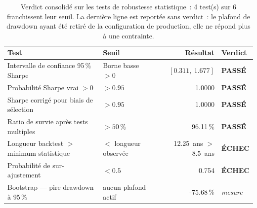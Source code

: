 \begin{table}[H]
\centering
\caption{Verdict consolidé sur les tests de robustesse statistique~: 4 test(s) sur 6 franchissent leur seuil. La dernière ligne est reportée sans verdict~: le plafond de drawdown ayant été retiré de la configuration de production, elle ne répond plus à une contrainte.}
\label{tab:robustness_verdict_summary}
\begin{tabular}{llrl}
\toprule
Test & Seuil & Résultat & Verdict \\
\midrule
Intervalle de confiance 95\,\% Sharpe & Borne basse $> 0$ & $[0.311,\ 1.677]$ & \textcolor{rsiGreen}{\textbf{PASSÉ}} \\
Probabilité Sharpe vrai $> 0$ & $> 0.95$ & 1.0000 & \textcolor{rsiGreen}{\textbf{PASSÉ}} \\
Sharpe corrigé pour biais de sélection & $> 0.95$ & 1.0000 & \textcolor{rsiGreen}{\textbf{PASSÉ}} \\
Ratio de survie après tests multiples & $> 50\,\%$ & 96.11\,\% & \textcolor{rsiGreen}{\textbf{PASSÉ}} \\
Longueur backtest $>$ minimum statistique & $<$ longueur observée & 12.25~ans $>$ 8.5~ans & \textcolor{tsOrange}{\textbf{ÉCHEC}} \\
Probabilité de sur-ajustement & $< 0.5$ & 0.754 & \textcolor{tsOrange}{\textbf{ÉCHEC}} \\
Bootstrap --- pire drawdown à 95\,\% & aucun plafond actif & -75.68\,\% & \emph{mesure} \\
\bottomrule
\end{tabular}
\end{table}

